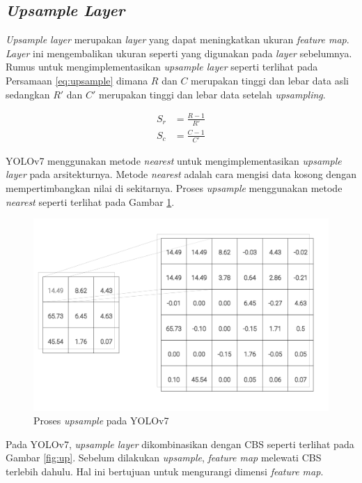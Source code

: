     \subsection{\textit{Upsample Layer}}
    \textit{Upsample layer} merupakan \textit{layer} yang dapat meningkatkan ukuran \textit{feature map}. \textit{Layer} ini mengembalikan ukuran seperti yang digunakan pada \textit{layer} sebelumnya. Rumus untuk mengimplementasikan \textit{upsample layer} seperti terlihat pada Persamaan \ref{eq:upsample} dimana $R$ dan $C$ merupakan tinggi dan lebar data asli sedangkan $R'$ dan $C'$ merupakan tinggi dan lebar data setelah \textit{upsampling}. 

    \begin{align}
        \label{eq:upsample}
        S_r &= \frac{R-1}{R'}\nonumber\\
        S_c &= \frac{C-1}{C'}
    \end{align}

    YOLOv7 menggunakan metode \textit{nearest} untuk mengimplementasikan \textit{upsample layer} pada arsitekturnya. Metode \textit{nearest} adalah cara mengisi data kosong dengan mempertimbangkan nilai di sekitarnya. Proses \textit{upsample} menggunakan metode \textit{nearest} seperti terlihat pada Gambar \ref{fig:il-nearest}.

    \begin{figure}[H]
        \begin{center}
            \includegraphics[width=12cm]{img/bab2/nearest.png}
            \caption{Proses \textit{upsample} pada YOLOv7}
            \label{fig:il-nearest}
        \end{center}
    \end{figure}

    Pada YOLOv7, \textit{upsample layer} dikombinasikan dengan CBS seperti terlihat pada Gambar \ref{fig:up}. Sebelum dilakukan \textit{upsample}, \textit{feature map} melewati CBS terlebih dahulu. Hal ini bertujuan untuk mengurangi dimensi \textit{feature map}.

